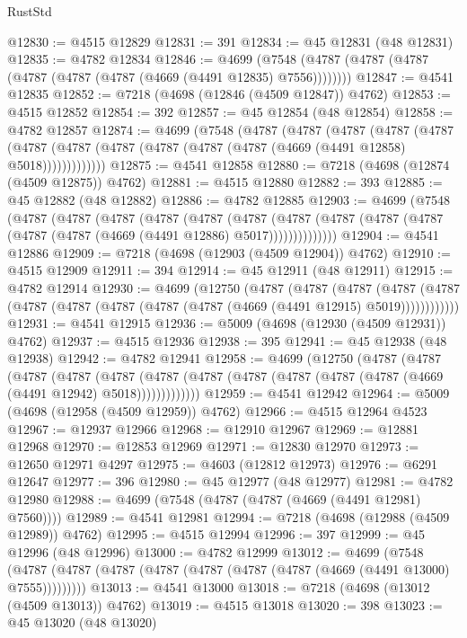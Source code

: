 \begin{lexlean}{RustStd}
\begin{coremodule}
@12830 := @4515 @12829
@12831 := 391
@12834 := @45 @12831 (@48 @12831)
@12835 := @4782 @12834
@12846 := @4699 (@7548 (@4787 (@4787 (@4787 (@4787 (@4787 (@4787 (@4669 (@4491 @12835) @7556))))))))
@12847 := @4541 @12835
@12852 := @7218 (@4698 (@12846 (@4509 @12847)) @4762)
@12853 := @4515 @12852
@12854 := 392
@12857 := @45 @12854 (@48 @12854)
@12858 := @4782 @12857
@12874 := @4699
    (@7548
      (@4787
        (@4787
          (@4787
            (@4787
              (@4787
                (@4787 (@4787 (@4787 (@4787 (@4787 (@4787 (@4669 (@4491 @12858) @5018)))))))))))))
@12875 := @4541 @12858
@12880 := @7218 (@4698 (@12874 (@4509 @12875)) @4762)
@12881 := @4515 @12880
@12882 := 393
@12885 := @45 @12882 (@48 @12882)
@12886 := @4782 @12885
@12903 := @4699
    (@7548
      (@4787
        (@4787
          (@4787
            (@4787
              (@4787
                (@4787
                  (@4787
                    (@4787 (@4787 (@4787 (@4787 (@4787 (@4669 (@4491 @12886) @5017))))))))))))))
@12904 := @4541 @12886
@12909 := @7218 (@4698 (@12903 (@4509 @12904)) @4762)
@12910 := @4515 @12909
@12911 := 394
@12914 := @45 @12911 (@48 @12911)
@12915 := @4782 @12914
@12930 := @4699
    (@12750
      (@4787
        (@4787
          (@4787
            (@4787 (@4787 (@4787 (@4787 (@4787 (@4787 (@4787 (@4669 (@4491 @12915) @5019))))))))))))
@12931 := @4541 @12915
@12936 := @5009 (@4698 (@12930 (@4509 @12931)) @4762)
@12937 := @4515 @12936
@12938 := 395
@12941 := @45 @12938 (@48 @12938)
@12942 := @4782 @12941
@12958 := @4699
    (@12750
      (@4787
        (@4787
          (@4787
            (@4787
              (@4787
                (@4787 (@4787 (@4787 (@4787 (@4787 (@4787 (@4669 (@4491 @12942) @5018)))))))))))))
@12959 := @4541 @12942
@12964 := @5009 (@4698 (@12958 (@4509 @12959)) @4762)
@12966 := @4515 @12964 @4523
@12967 := @12937 @12966
@12968 := @12910 @12967
@12969 := @12881 @12968
@12970 := @12853 @12969
@12971 := @12830 @12970
@12973 := @12650 @12971 @4297
@12975 := @4603 (@12812 @12973)
@12976 := @6291 @12647
@12977 := 396
@12980 := @45 @12977 (@48 @12977)
@12981 := @4782 @12980
@12988 := @4699 (@7548 (@4787 (@4787 (@4669 (@4491 @12981) @7560))))
@12989 := @4541 @12981
@12994 := @7218 (@4698 (@12988 (@4509 @12989)) @4762)
@12995 := @4515 @12994
@12996 := 397
@12999 := @45 @12996 (@48 @12996)
@13000 := @4782 @12999
@13012 := @4699
    (@7548 (@4787 (@4787 (@4787 (@4787 (@4787 (@4787 (@4787 (@4669 (@4491 @13000) @7555)))))))))
@13013 := @4541 @13000
@13018 := @7218 (@4698 (@13012 (@4509 @13013)) @4762)
@13019 := @4515 @13018
@13020 := 398
@13023 := @45 @13020 (@48 @13020)

\end{coremodule}
\end{lexlean}
